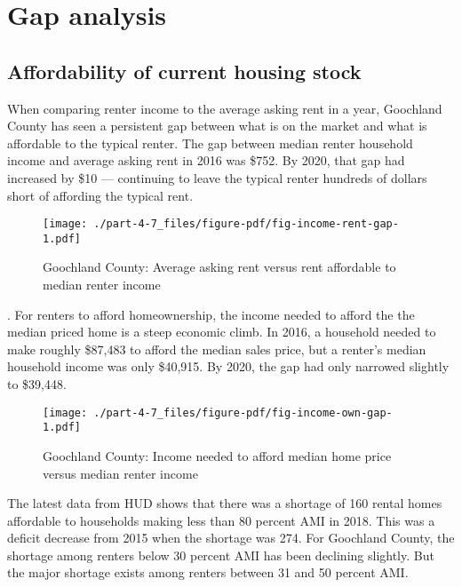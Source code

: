 \documentclass[
  letterpaper,
  DIV=11,
  numbers=noendperiod]{scrreprt}
\begin{document}
\hypertarget{gap-analysis-6}{%
\section{Gap analysis}\label{gap-analysis-6}}

\hypertarget{affordability-of-current-housing-stock-6}{%
\subsection{Affordability of current housing
stock}\label{affordability-of-current-housing-stock-6}}

When comparing renter income to the average asking rent in a year,
Goochland County has seen a persistent gap between what is on the market
and what is affordable to the typical renter. The gap between median
renter household income and average asking rent in 2016 was \$752. By
2020, that gap had increased by \$10 --- continuing to leave the typical
renter hundreds of dollars short of affording the typical rent.

\begin{figure}

{\centering \texttt{[image: ./part-4-7\_files/figure-pdf/fig-income-rent-gap-1.pdf]}

}

\caption{\label{fig-income-rent-gap}Goochland County: Average asking
rent versus rent affordable to median renter income}

\end{figure}

. For renters to afford homeownership, the income needed to afford the
the median priced home is a steep economic climb. In 2016, a household
needed to make roughly \$87,483 to afford the median sales price, but a
renter's median household income was only \$40,915. By 2020, the gap had
only narrowed slightly to \$39,448.

\begin{figure}

{\centering \texttt{[image: ./part-4-7\_files/figure-pdf/fig-income-own-gap-1.pdf]}

}

\caption{\label{fig-income-own-gap}Goochland County: Income needed to
afford median home price versus median renter income}

\end{figure}

The latest data from HUD shows that there was a shortage of 160 rental
homes affordable to households making less than 80 percent AMI in 2018.
This was a deficit decrease from 2015 when the shortage was 274. For
Goochland County, the shortage among renters below 30 percent AMI has
been declining slightly. But the major shortage exists among renters
between 31 and 50 percent AMI.
\end{document}
